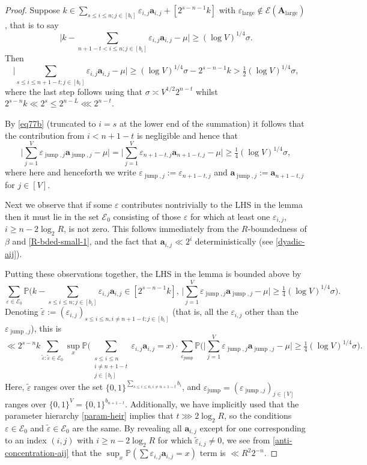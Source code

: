 \documentclass[11pt,reqno]{amsart}
\numberwithin{equation}{section}
\theoremstyle{definition}
\theoremstyle{remark}
\newcommand{\mb}{\mathbb}
\newcommand{\mbf}{\mathbf}
\newcommand{\eps}{\varepsilon}
\renewcommand{\le}{\leqslant}
\renewcommand{\ge}{\geqslant}
\newcommand\jump{\operatorname{jump}}
\def\lrg{\operatorname{large}}
\begin{document}
\begin{proof} Suppose $k \in \sum_{s \le i \le n; j \in [b_i]} \eps_{i,j} \mbf{a}_{i,j}  + [2^{s -n - 1} k]$ with $\eps_{\lrg} \notin \mathcal{E}(\mbf{A}_{\lrg})$, that is to say \[ \Big|k - \sum_{n + 1 - t < i \le n;j \in [b_i]} \eps_{i,j} \mathbf{a}_{i,j} - \mu\Big| \ge  (\log V)^{1/4}\sigma.\] Then \[ \Big|\sum_{s \le i \le n +1 - t;j \in [b_i]} \eps_{i,j} \mbf{a}_{i,j} - \mu\Big| \ge (\log V)^{1/4}\sigma - 2^{s - n - 1} k > \tfrac{1}{2} (\log V)^{1/4}\sigma,\] where the last step follows using that $\sigma \asymp V^{1/2} 2^{n - t}$ whilst $2^{s - n} k \ll 2^s \le 2^{n - L} \lll 2^{n - t}$. 


By \cref{eq77b} (truncated to $i = s$ at the lower end of the summation) it follows that the contribution from $i < n +1 - t$ is negligible and hence that
\[ \Big|\sum_{j=1}^V \eps_{\jump,j} \textbf{a}_{\jump,j} - \mu\big| = \Big|\sum_{j=1}^V \eps_{n +1 - t,j} \mbf{a}_{n +1 - t,j} - \mu\big| \ge \tfrac{1}{4} (\log V)^{1/4}\sigma,\] where here and henceforth we write $\eps_{\jump, j} := \eps_{n + 1 - t,j}$ and $\mbf{a}_{\jump, j} := \mbf{a}_{n +1 - t,j}$ for $j \in [V]$. 

Next we observe that if some $\eps$ contributes nontrivially to the LHS in the lemma then it must lie in the set $\mathcal{E}_0$ consisting of those $\eps$ for which at least one $\eps_{i,j}$, $i \ge  n - 2 \log_2 R$, is not zero. This follows immediately from the $R$-boundedness of $\beta$ and \cref{R-bded-small-1}, and the fact that $\mbf{a}_{i,j} \ll 2^{i}$ deterministically (see \cref{dyadic-aij}).



Putting these observations together, the LHS in the lemma is bounded above by
\[ \sum_{\eps \in \mathcal{E}_0} \mb{P}\Big(k - \sum_{s \le i \le n;j \in [b_i]} \eps_{i,j} \mathbf{a}_{i,j} \in [2^{s - n - 1} k],\, \big|\sum_{j=1}^V \eps_{\jump,j} \textbf{a}_{\jump,j} - \mu\big| \ge \tfrac{1}{4} (\log V)^{1/4}\sigma\Big). \]
Denoting $\tilde\eps := (\eps_{i,j})_{s \le i \le n, i \neq n +1 - t; j \in [b_i]}$ (that is, all the $\eps_{i,j}$ other than the $\eps_{\jump, j}$), this is 
\[ \ll 2^{s - n} k\sum_{\tilde\eps: \tilde\eps \in \mathcal{E}_0}  \sup_x \mb{P} \big( \sum_{\substack{s \le i \le n \\ i \neq n +1 - t \\ j \in [b_i]}} \eps_{i,j} \mathbf{a}_{i,j} = x\big) \cdot \sum_{\eps_{\jump}} \mb{P} \Big( \big|\sum_{j=1}^V \eps_{\jump,j} \textbf{a}_{\jump,j} - \mu\big| \ge \tfrac{1}{4} (\log V)^{1/4}\sigma\Big). \]
Here, $\tilde\eps$ ranges over the set $\{0,1\}^{\sum_{s \le i \le n, i \ne n + 1 - t} b_i}$, and $\eps_{\jump} = (\eps_{\jump, j})_{j \in [V]}$ ranges over $\{0,1\}^V = \{0,1\}^{b_{n + 1 - t}}$. Additionally, we have implicitly used that the parameter hierarchy \cref{param-heir} implies that $t \ggg 2\log_2 R$, so the conditions $\eps \in \mathcal{E}_0$ and $\tilde\eps \in \mathcal{E}_0$ are the same.
By revealing all $\mathbf{a}_{i,j}$ except for one corresponding to an index $(i,j)$ with $i \ge n -  2 \log_2 R$ for which $\tilde\eps_{i,j} \ne 0$, we see from \cref{anti-concentration-aij} that the $\sup_x \mb{P}( \sum \eps_{i,j} \mbf{a}_{i,j} = x)$ term is $\ll R^2 2^{-n}$.


\end{proof}
\end{document}
